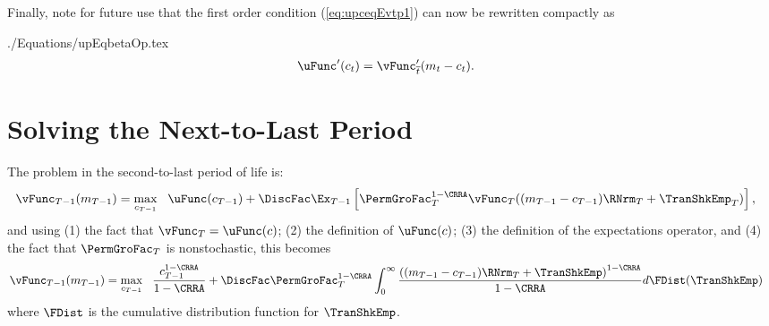 \documentclass[titlepage, headings=optiontotocandhead]{\econtex}
\begin{document}
Finally, note for future use that the first order condition
(\ref{eq:upceqEvtp1}) can now be rewritten compactly as
\begin{verbatimwrite}{./Equations/upEqbetaOp.tex}
  \begin{equation}\begin{gathered}\begin{aligned}
        \uFunc^{\prime}({c}_{t})   & = \vEOPt^{\prime}({m}_{t}-{c}_{t}).
        \label{eq:upEqbetaOp}
      \end{aligned}\end{gathered}\end{equation}
\end{verbatimwrite}
\unskip

\hypertarget{Solving-the-Next-To-Last-Period}{}\section{Solving the Next-to-Last Period}\label{sec:NextToLast}

The problem in the second-to-last period of life is:
\begin{equation*}\begin{gathered}\begin{aligned}
      \null{\vFunc}_{T-1}({m}_{T-1})  & = \max_{{c}_{T-1}} ~~ \uFunc({c}_{T-1}) +
      \DiscFac \Ex_{T-1} \left[\PermGroFac_{T}^{1-\CRRA}\null{\vFunc}_{T}(({m}_{T-1} - {c}_{T-1})\RNrm_{T} + \TranShkEmp_{T})\right],
    \end{aligned}\end{gathered}\end{equation*}
and using (1) the fact that $\vFunc_{T}=\uFunc(c)$; (2) the definition of $\uFunc(c)$; (3) the
definition of the expectations operator, and (4) the fact that $\PermGroFac_{T}$ is nonstochastic, this becomes
\begin{equation*}\begin{gathered}\begin{aligned}
      \null{\vFunc}_{T-1}({m}_{T-1})   & = \max_{{c}_{T-1}} ~~
      \frac{{c}_{T-1}^{1-\CRRA}}{1-\CRRA} + \DiscFac \PermGroFac_{T}^{1-\CRRA}\int_{0}^{\infty}
      \frac{\left(({m}_{T-1}-{c}_{T-1})\RNrm_{T}+ \TranShkEmp\right)^{1-\CRRA}}{1-\CRRA}
      d\FDist(\TranShkEmp)
    \end{aligned}\end{gathered}\end{equation*}
where $\FDist$ is the cumulative distribution function for ${\TranShkEmp}$.
\end{document}
